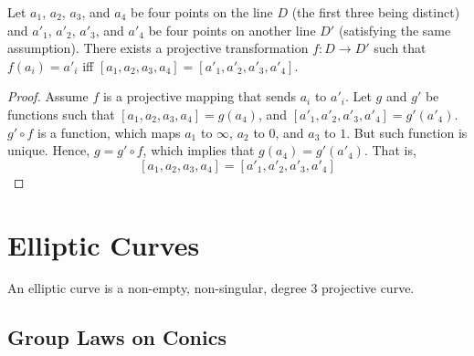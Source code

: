 \begin{prop}
  Let $a_1$, $a_2$, $a_3$, and $a_4$ be four points on the line $D$ (the first three being
  distinct) and $a'_1$, $a'_2$, $a'_3$, and $a'_4$ be four points on another line $D'$
  (satisfying the same assumption). There exists a projective transformation $f:D\rightarrow D'$
  such that $f(a_i)=a'_i$ iff $[a_1,a_2,a_3,a_4]=[a'_1,a'_2,a'_3,a'_4]$.
\end{prop}

\begin{proof}
  Assume $f$ is a projective mapping that sends $a_i$ to $a'_i$. Let $g$ and $g'$ be functions
  such that $[a_1,a_2,a_3,a_4]=g(a_4)$, and $[a'_1,a'_2,a'_3,a'_4]=g'(a'_4)$. $g'\circ f$ is a
  function, which maps $a_1$ to $\infty$, $a_2$ to $0$, and $a_3$ to $1$. But such function is
  unique. Hence, $g=g'\circ f$, which implies that $g(a_4)=g'(a'_4)$. That is,
  \[
    [a_1,a_2,a_3,a_4]=[a'_1,a'_2,a'_3,a'_4]
  \]
\end{proof}

\section{Elliptic Curves}

\begin{definition}
  An elliptic curve is a non-empty, non-singular, degree 3 projective curve. \cite{spallone}
\end{definition}

\subsection{Group Laws on Conics}
